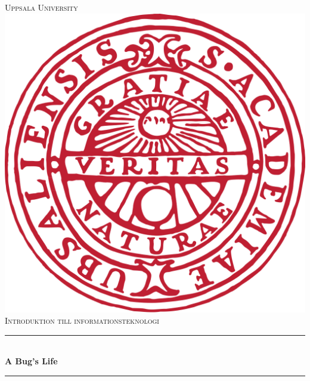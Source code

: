 \documentclass[12pt]{article}
\begin{document}
\begin{titlepage}

\newcommand{\HRule}{\rule{\linewidth}{0.5mm}} %

\center%
 

\textsc{\LARGE Uppsala University}\\[1.5cm] %
\includegraphics[scale=.1]{Uppsala_University_seal_svg.png}\\[1cm] %
\textsc{\Large Introduktion till informationsteknologi}\\[0.5cm] %

\HRule\\[0.4cm]
{ \huge \bfseries A Bug's Life}\\[0.4cm] %
\HRule\\[1.5cm]
 

\end{titlepage}
\end{document}
